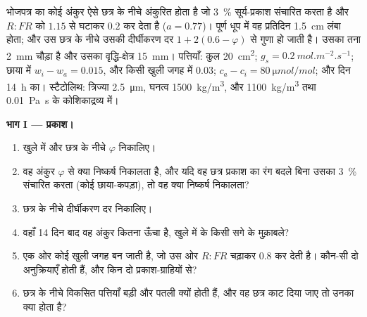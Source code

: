 \begin{problem}
\label{pb:b2:plant-plasticity:1}
भोजपत्र का कोई अंकुर ऐसे छत्र के नीचे अंकुरित होता है जो
\qty{3}{\%} सूर्य-प्रकाश संचारित करता है और $R{:}FR$ को $1.15$ से
घटाकर $0.2$ कर देता है ($a = 0.77$)। पूर्ण धूप में वह प्रतिदिन
\qty{1.5}{cm} लंबा होता; और उस छत्र के नीचे उसकी दीर्घीकरण दर $1 +
2(0.6 - \varphi)$ से गुणा हो जाती है। उसका तना \qty{2}{mm} चौड़ा है और
उसका वृद्धि-क्षेत्र \qty{15}{mm}। पत्तियाँ: कुल \qty{20}{cm^2}; $g_s =
\qty{0.2}{mol.m^{-2}.s^{-1}}$; छाया में $w_i - w_a = 0.015$, और
किसी खुली जगह में $0.03$; $c_a - c_i = \qty{80}{\micro mol/mol}$; और दिन
\qty{14}{h} का। स्टैटोलिथ: त्रिज्या \qty{2.5}{\micro m}, घनत्व
\qty{1500}{kg/m^3}, और \qty{1100}{kg/m^3} तथा
\qty{0.01}{Pa.s} के कोशिकाद्रव्य में।

\medskip
\noindent\textbf{भाग I --- प्रकाश।}
\begin{enumerate}
  \item खुले में और छत्र के नीचे $\varphi$ निकालिए।
  \item वह अंकुर $\varphi$ से क्या निष्कर्ष निकालता है, और यदि वह
        छत्र प्रकाश का रंग बदले बिना उसका \qty{3}{\%} संचारित करता
        (कोई छाया-कपड़ा), तो वह क्या निष्कर्ष निकालता?
  \item छत्र के नीचे दीर्घीकरण दर निकालिए।
  \item वहाँ 14 दिन बाद वह अंकुर कितना ऊँचा है, खुले में के किसी सगे
        के मुक़ाबले?
  \item एक ओर कोई खुली जगह बन जाती है, जो उस ओर $R{:}FR$ चढ़ाकर
        $0.8$ कर देती है। कौन-सी दो अनुक्रियाएँ होती हैं, और किन दो
        प्रकाश-ग्राहियों से?
  \item छत्र के नीचे विकसित पत्तियाँ बड़ी और पतली क्यों होती हैं, और
        वह छत्र काट दिया जाए तो उनका क्या होता है?
\end{enumerate}


\end{problem}
